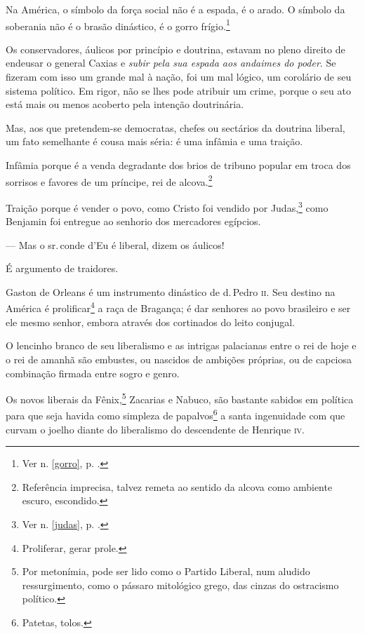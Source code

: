 Na América, o símbolo da força social não é a espada, é o arado. O
símbolo da soberania não é o brasão dinástico, é o gorro
frígio.\footnote{Ver n. \ref{gorro}, p. \pageref{gorro}.}

Os conservadores, áulicos por princípio e doutrina, estavam no pleno
direito de endeusar o general Caxias e \emph{subir pela sua espada aos
andaimes do poder}. Se fizeram com isso um grande mal à nação, foi um
mal lógico, um corolário de seu sistema político. Em rigor, não se lhes
pode atribuir um crime, porque o seu ato está mais ou menos acoberto
pela intenção doutrinária.

Mas, aos que pretendem-se democratas, chefes ou sectários da doutrina
liberal, um fato semelhante é cousa mais séria: é uma infâmia e uma
traição.

Infâmia porque é a venda degradante dos brios de tribuno popular em
troca dos sorrisos e favores de um príncipe, rei de alcova.\footnote{
  Referência imprecisa, talvez remeta ao sentido da alcova como ambiente
  escuro, escondido.}


Traição porque é vender o povo, como Cristo foi vendido por
Judas,\footnote{Ver n. \ref{judas}, p. \pageref{judas}.} como Benjamin foi
entregue ao senhorio dos mercadores egípcios.

--- Mas o sr.\,conde d'Eu é liberal, dizem os áulicos!

É argumento de traidores.

Gaston de Orleans é um instrumento dinástico de d.\,Pedro \textsc{ii}. Seu destino
na América é prolificar\footnote{Proliferar, gerar prole.} a raça de
Bragança; é dar senhores ao povo brasileiro e ser ele mesmo senhor,
embora através dos cortinados do leito conjugal.

O lencinho branco de seu liberalismo e as intrigas palacianas entre o
rei de hoje e o rei de amanhã são embustes, ou nascidos de ambições
próprias, ou de capciosa combinação firmada entre sogro e genro.

Os novos liberais da Fênix,\footnote{Por metonímia, pode ser lido como
  o Partido Liberal, num aludido ressurgimento, como o pássaro
  mitológico grego, das cinzas do ostracismo político.} Zacarias e
Nabuco, são bastante sabidos em política para que seja havida como
simpleza de papalvos\footnote{Patetas, tolos.} a santa ingenuidade com
que curvam o joelho diante do liberalismo do descendente de Henrique \textsc{iv}.

